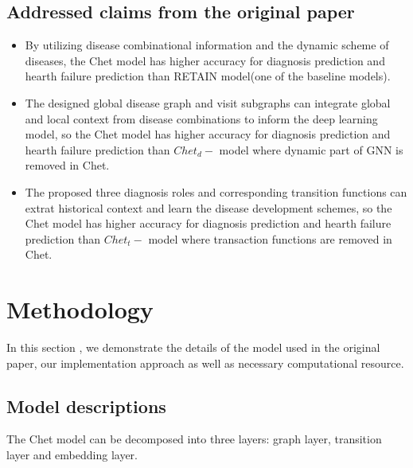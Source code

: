 \documentclass[11pt,a4paper]{article}
\begin{document}
\subsection{Addressed claims from the original paper}
\begin{itemize}
    \item By utilizing disease combinational information and the dynamic scheme of diseases, the Chet model has higher accuracy for diagnosis prediction and hearth failure prediction than RETAIN model(one of the baseline models). 
    \item The designed global disease graph and visit subgraphs can integrate global and local context from disease combinations to inform the deep learning model, so the Chet model has higher accuracy for diagnosis prediction and hearth failure prediction than $Chet_d-$ model where dynamic part of GNN is removed in Chet.
    \item The proposed three diagnosis roles and corresponding transition functions can extrat historical context and learn the disease development schemes, so the Chet model has higher accuracy for diagnosis prediction and hearth failure prediction than $Chet_t-$ model where transaction functions are removed in Chet.
\end{itemize}

\section{Methodology}
In this section , we demonstrate the details of the model used in the original paper, our implementation approach as well as necessary computational resource.
\subsection{Model descriptions}
The Chet model can be decomposed into three layers: graph layer, transition layer and embedding layer.
\end{document}
